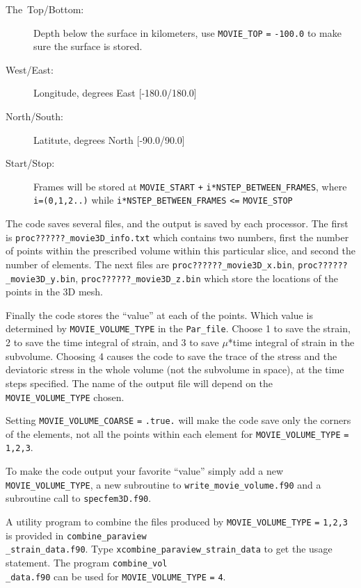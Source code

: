 \documentclass[oneside,english]{book}
\begin{document}
\begin{description}
\item [{The~Top/Bottom:}] Depth below the surface in kilometers, use \texttt{\small MOVIE\_TOP}
\texttt{\small =} \texttt{\small -100.0} to make sure the surface
is stored.
\item [{West/East:}] Longitude, degrees East {[}-180.0/180.0]
\item [{North/South:}] Latitute, degrees North {[}-90.0/90.0]
\item [{Start/Stop:}] Frames will be stored at \texttt{\small MOVIE\_START}
\texttt{\small +} \texttt{\small i{*}NSTEP\_BETWEEN\_FRAMES}, where
\texttt{\small i=(0,1,2..)} while \texttt{\small i{*}NSTEP\_BETWEEN\_FRAMES}
\texttt{\small <=} \texttt{\small MOVIE\_STOP}{\small \par}
\end{description}
The code saves several files, and the output is saved by each processor.
The first is \texttt{\small proc??????\_movie3D\_info.txt} which contains
two numbers, first the number of points within the prescribed volume
within this particular slice, and second the number of elements. The
next files are \texttt{\small proc??????\_movie3D\_x.bin}, \texttt{\small proc??????\_movie3D\_y.bin},
\texttt{\small proc??????\_movie3D\_z.bin} which store the locations
of the points in the 3D mesh.

Finally the code stores the ``value'' at each of the points. Which
value is determined by \texttt{\small MOVIE\_VOLUME\_TYPE} in the
\texttt{\small Par\_file}. Choose 1 to save the strain, 2 to save
the time integral of strain, and 3 to save $\mu${*}time integral
of strain in the subvolume. Choosing 4 causes the code to save the
trace of the stress and the deviatoric stress in the whole volume
(not the subvolume in space), at the time steps specified. The name
of the output file will depend on the \texttt{\small MOVIE\_VOLUME\_TYPE}
chosen.

Setting \texttt{\small MOVIE\_VOLUME\_COARSE} \texttt{\small =} \texttt{\small .true.}
will make the code save only the corners of the elements, not all
the points within each element for \texttt{\small MOVIE\_VOLUME\_TYPE}
\texttt{\small =} \texttt{\small 1,2,3}.

To make the code output your favorite ``value'' simply add a new \texttt{\small MOVIE\_VOLUME\_TYPE},
a new subroutine to \texttt{\small write\_movie\_volume.f90} and a
subroutine call to \texttt{\small specfem3D.f90}.

A utility program to combine the files produced by \texttt{\small MOVIE\_VOLUME\_TYPE}
\texttt{\small =} \texttt{\small 1,2,3} is provided in \texttt{\small combine\_paraview}~\\
\texttt{\small \_strain\_data.f90}. Type \texttt{\small xcombine\_paraview\_strain\_data}
to get the usage statement. The program \texttt{\small combine\_vol}~\\
\texttt{\small \_data.f90} can be used for \texttt{\small MOVIE\_VOLUME\_TYPE}
\texttt{\small =} \texttt{\small 4}.
\end{document}
